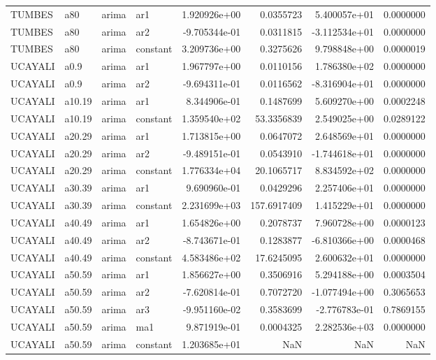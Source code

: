 \documentclass[
]{article}
\begin{document}
\begin{table}[!h]
\begin{tabular}[t]{llllrrrr}
TUMBES & a80 & arima & ar1 & 1.920926e+00 & 0.0355723 & 5.400057e+01 & 0.0000000\\
TUMBES & a80 & arima & ar2 & -9.705344e-01 & 0.0311815 & -3.112534e+01 & 0.0000000\\
TUMBES & a80 & arima & constant & 3.209736e+00 & 0.3275626 & 9.798848e+00 & 0.0000019\\
\addlinespace
UCAYALI & a0.9 & arima & ar1 & 1.967797e+00 & 0.0110156 & 1.786380e+02 & 0.0000000\\
UCAYALI & a0.9 & arima & ar2 & -9.694311e-01 & 0.0116562 & -8.316904e+01 & 0.0000000\\
UCAYALI & a10.19 & arima & ar1 & 8.344906e-01 & 0.1487699 & 5.609270e+00 & 0.0002248\\
UCAYALI & a10.19 & arima & constant & 1.359540e+02 & 53.3356839 & 2.549025e+00 & 0.0289122\\
UCAYALI & a20.29 & arima & ar1 & 1.713815e+00 & 0.0647072 & 2.648569e+01 & 0.0000000\\
\addlinespace
UCAYALI & a20.29 & arima & ar2 & -9.489151e-01 & 0.0543910 & -1.744618e+01 & 0.0000000\\
UCAYALI & a20.29 & arima & constant & 1.776334e+04 & 20.1065717 & 8.834592e+02 & 0.0000000\\
UCAYALI & a30.39 & arima & ar1 & 9.690960e-01 & 0.0429296 & 2.257406e+01 & 0.0000000\\
UCAYALI & a30.39 & arima & constant & 2.231699e+03 & 157.6917409 & 1.415229e+01 & 0.0000000\\
UCAYALI & a40.49 & arima & ar1 & 1.654826e+00 & 0.2078737 & 7.960728e+00 & 0.0000123\\
\addlinespace
UCAYALI & a40.49 & arima & ar2 & -8.743671e-01 & 0.1283877 & -6.810366e+00 & 0.0000468\\
UCAYALI & a40.49 & arima & constant & 4.583486e+02 & 17.6245095 & 2.600632e+01 & 0.0000000\\
UCAYALI & a50.59 & arima & ar1 & 1.856627e+00 & 0.3506916 & 5.294188e+00 & 0.0003504\\
UCAYALI & a50.59 & arima & ar2 & -7.620814e-01 & 0.7072720 & -1.077494e+00 & 0.3065653\\
UCAYALI & a50.59 & arima & ar3 & -9.951160e-02 & 0.3583699 & -2.776783e-01 & 0.7869155\\
\addlinespace
UCAYALI & a50.59 & arima & ma1 & 9.871919e-01 & 0.0004325 & 2.282536e+03 & 0.0000000\\
UCAYALI & a50.59 & arima & constant & 1.203685e+01 & NaN & NaN & NaN\\

\end{tabular}
\end{table}
\end{document}
